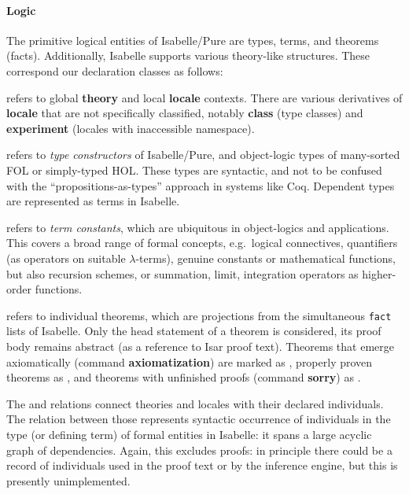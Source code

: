 \paragraph{Logic}
The primitive logical entities of Isabelle/Pure are types, terms, and theorems (facts).
Additionally, Isabelle supports various theory-like structures.
These correspond our declaration classes as follows:
\begin{compactitem}
\item {} refers to global \textbf{theory} and local \textbf{locale} contexts. There are various derivatives of \textbf{locale} that are not specifically classified, notably \textbf{class} (type classes) and \textbf{experiment} (locales with inaccessible namespace).
\item {} refers to \emph{type constructors} of Isabelle/Pure, and object-logic types of many-sorted FOL or simply-typed HOL. These types are syntactic, and not to be confused with the ``propositions-as-types'' approach in systems like Coq. Dependent types are represented as terms in Isabelle.
\item {} refers to \emph{term constants}, which are ubiquitous in object-logics and applications. This covers a broad range of formal concepts, e.g.\ logical connectives, quantifiers (as operators on suitable $\lambda$-terms), genuine constants or mathematical functions, but also recursion schemes, or summation, limit, integration operators as higher-order functions.
\item {} refers to individual theorems, which are projections from the simultaneous \texttt{fact} lists of Isabelle.  Only the head statement of a theorem is considered, its proof body remains abstract (as a reference to Isar proof text).
Theorems that emerge axiomatically (command \textbf{axiomatization}) are marked as , properly proven theorems as , and theorems with unfinished proofs (command \textbf{sorry}) as .
\end{compactitem}

\noindent The  and  relations connect theories and locales with their declared individuals.
The  relation between those represents syntactic occurrence of individuals in the type (or defining term) of formal entities in Isabelle: it spans a large acyclic graph of dependencies. Again, this excludes proofs: in principle there could be a record of individuals used in the proof text or by the inference engine, but this is presently unimplemented.

